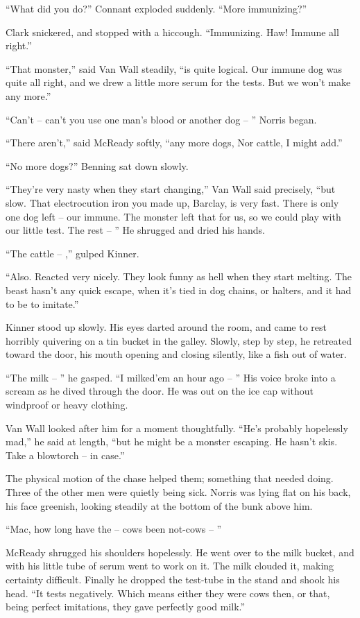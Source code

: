 \documentclass[letterpaper,openany,12pt]{memoir}		%
\begin{document}
``What did you do?'' Connant exploded suddenly. ``More immunizing?''

Clark snickered, and stopped with a hiccough. ``Immunizing. Haw! Immune all
right.''

``That monster,'' said Van Wall steadily, ``is quite logical. Our immune dog was
quite all right, and we drew a little more serum for the tests. But we won't
make any more.''

``Can't -- can't you use one man's blood or another dog -- '' Norris began.

``There aren't,'' said McReady softly, ``any more dogs, Nor cattle, I might
add.''

``No more dogs?'' Benning sat down slowly.

``They're very nasty when they start changing,'' Van Wall said precisely, ``but
slow. That electrocution iron you made up, Barclay, is very fast. There is only
one dog left -- our immune. The monster left that for us, so we could play with
our little test. The rest -- '' He shrugged and dried his hands.

``The cattle -- ,'' gulped Kinner.

``Also. Reacted very nicely. They look funny as hell when they start melting.
The beast hasn't any quick escape, when it's tied in dog chains, or halters, and
it had to be to imitate.''

Kinner stood up slowly. His eyes darted around the room, and came to rest
horribly quivering on a tin bucket in the galley. Slowly, step by step, he
retreated toward the door, his mouth opening and closing silently, like a fish
out of water.

``The milk -- '' he gasped. ``I milked'em an hour ago -- '' His voice broke into
a scream as he dived through the door. He was out on the ice cap without
windproof or heavy clothing.

Van Wall looked after him for a moment thoughtfully. ``He's probably hopelessly
mad,'' he said at length, ``but he might be a monster escaping. He hasn't skis.
Take a blowtorch -- in case.''

The physical motion of the chase helped them; something that needed doing. Three
of the other men were quietly being sick. Norris was lying flat on his back, his
face greenish, looking steadily at the bottom of the bunk above him.

``Mac, how long have the -- cows been not-cows -- ''

McReady shrugged his shoulders hopelessly. He went over to the milk bucket, and
with his little tube of serum went to work on it. The milk clouded it, making
certainty difficult. Finally he dropped the test-tube in the stand and shook his
head. ``It tests negatively. Which means either they were cows then, or that,
being perfect imitations, they gave perfectly good milk.''
\end{document}
